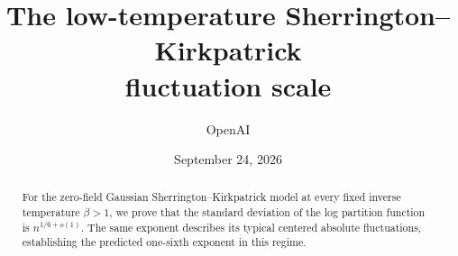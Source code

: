 \documentclass[11pt]{article}
\title{The low-temperature Sherrington--Kirkpatrick\\ fluctuation scale}
\author{OpenAI}
\date{September 24, 2026}
\theoremstyle{definition}
\theoremstyle{remark}
\numberwithin{equation}{section}
\begin{document}
\maketitle
\begin{abstract}
For the zero-field Gaussian Sherrington--Kirkpatrick model at every fixed inverse temperature $\beta>1$, we prove that the standard deviation of the log partition function is $n^{1/6+o(1)}$. The same exponent describes its typical centered absolute fluctuations, establishing the predicted one-sixth exponent in this regime.
\end{abstract}

\tableofcontents







\begingroup
\raggedright


\endgroup
\end{document}
